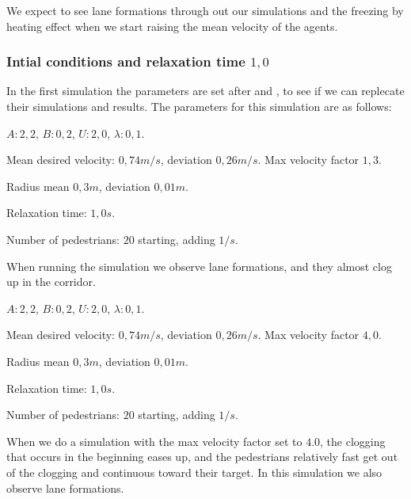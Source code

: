 We expect to see lane formations through out our simulations
and the freezing by heating effect when we start raising the mean velocity
of the agents.

\subsubsection{Intial conditions and relaxation time $1,0$}
In the first simulation the parameters are set after \cite{ABconstant} and
\cite{self-org}, to see if we can replecate their simulations and results.
The parameters for this simulation are as follows:

\begin{itemize*}
    \item $A: 2,2$, $B: 0,2$, $U: 2,0$, $\lambda: 0,1$.
    \item Mean desired velocity: $0,74 m/s$, deviation $0,26 m/s$. Max 
        velocity factor $1,3$.
    \item Radius mean $0,3 m$, deviation $0,01 m$.
    \item Relaxation time: $1,0 s$.
    \item Number of pedestrians: $20$ starting, adding $1/s$.
\end{itemize*}

When running the simulation we observe lane formations, and they almost clog up
in the corridor.

\begin{itemize*}
    \item $A: 2,2$, $B: 0,2$, $U: 2,0$, $\lambda: 0,1$.
    \item Mean desired velocity: $0,74 m/s$, deviation $0,26 m/s$. Max 
        velocity factor $4,0$.
    \item Radius mean $0,3 m$, deviation $0,01 m$.
    \item Relaxation time: $1,0 s$.
    \item Number of pedestrians: $20$ starting, adding $1/s$.
\end{itemize*}

When we do a simulation with the max velocity factor set to $4.0$, the clogging
that occurs in the beginning eases up, and the pedestrians relatively fast
get out of the clogging and continuous toward their target. In this simulation
we also observe lane formations.

